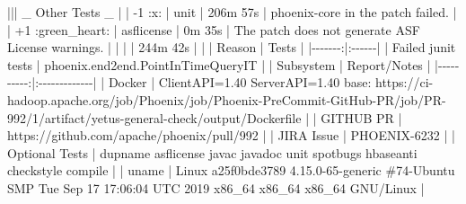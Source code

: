 \documentclass{report}%
\begin{document}
\begin{enumerate}
\newline%
   ||| \_ Other Tests \_ |\newline%
\newline%
   | {-}1 :x: |  unit  | 206m 57s |  phoenix{-}core in the patch failed.  |\newline%
\newline%
   | +1 :green\_heart: |  asflicense  |   0m 35s |  The patch does not generate ASF License warnings.  |\newline%
\newline%
   |  |   | 244m 42s |   |\newline%
\newline%
  \newline%
  \newline%
   | Reason | Tests |\newline%
\newline%
   |{-}{-}{-}{-}{-}{-}{-}:|:{-}{-}{-}{-}{-}{-}|\newline%
\newline%
   | Failed junit tests | phoenix.end2end.PointInTimeQueryIT |\newline%
\newline%
  \newline%
  \newline%
   | Subsystem | Report/Notes |\newline%
\newline%
   |{-}{-}{-}{-}{-}{-}{-}{-}{-}{-}:|:{-}{-}{-}{-}{-}{-}{-}{-}{-}{-}{-}{-}{-}|\newline%
\newline%
   | Docker | ClientAPI=1.40 ServerAPI=1.40 base: https://ci{-}hadoop.apache.org/job/Phoenix/job/Phoenix{-}PreCommit{-}GitHub{-}PR/job/PR{-}992/1/artifact/yetus{-}general{-}check/output/Dockerfile |\newline%
\newline%
   | GITHUB PR | https://github.com/apache/phoenix/pull/992 |\newline%
\newline%
   | JIRA Issue | PHOENIX{-}6232 |\newline%
\newline%
   | Optional Tests | dupname asflicense javac javadoc unit spotbugs hbaseanti checkstyle compile |\newline%
\newline%
   | uname | Linux a25f0bde3789 4.15.0{-}65{-}generic \#74{-}Ubuntu SMP Tue Sep 17 17:06:04 UTC 2019 x86\_64 x86\_64 x86\_64 GNU/Linux |\newline%

\end{enumerate}
\end{document}
